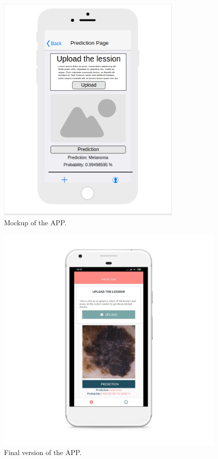 \begin{figure}[H]
\centering
\includegraphics[width=0.8\textwidth]{./figures/Mockup}
\caption{Mockup of the APP.}
\end{figure}


\begin{figure}[H]
\centering
\includegraphics[width=1\textwidth]{./figures/mockup-android}
\caption{Final version of the APP.}
\end{figure}



